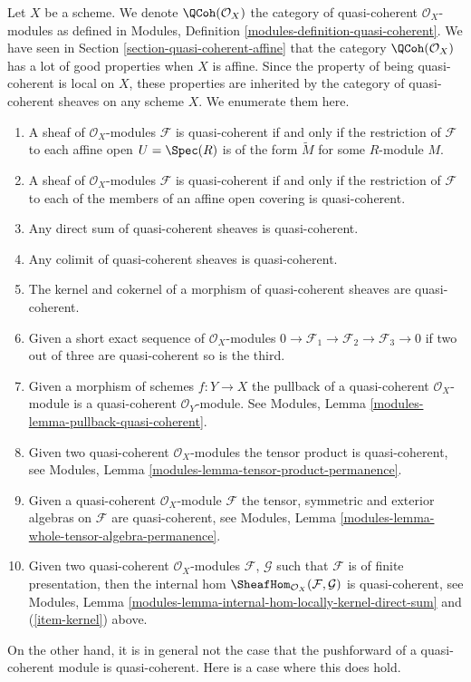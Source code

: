 \noindent
Let $X$ be a scheme. We denote $\QCoh(\mathcal{O}_X)$ the
category of quasi-coherent $\mathcal{O}_X$-modules as defined in
Modules, Definition \ref{modules-definition-quasi-coherent}.
We have seen in
Section \ref{section-quasi-coherent-affine}
that the category $\QCoh(\mathcal{O}_X)$ has a lot of good properties
when $X$ is affine. Since the property of being quasi-coherent is
local on $X$, these properties are inherited by the category
of quasi-coherent sheaves on any scheme $X$. We enumerate them here.
\begin{enumerate}
\item A sheaf of $\mathcal{O}_X$-modules $\mathcal{F}$ is
quasi-coherent if and only if the restriction of $\mathcal{F}$
to each affine open $U = \Spec(R)$ is of the form
$\widetilde M$ for some $R$-module $M$.
\item A sheaf of $\mathcal{O}_X$-modules $\mathcal{F}$ is
quasi-coherent if and only if the restriction of $\mathcal{F}$
to each of the members of an affine open covering is quasi-coherent.
\item Any direct sum of quasi-coherent sheaves is quasi-coherent.
\item Any colimit of quasi-coherent sheaves is quasi-coherent.
\item
\label{item-kernel}
The kernel and cokernel of a morphism of quasi-coherent sheaves
are quasi-coherent.
\item Given a short exact sequence of $\mathcal{O}_X$-modules
$0 \to \mathcal{F}_1 \to \mathcal{F}_2 \to \mathcal{F}_3 \to 0$
if two out of three are quasi-coherent so is the third.
\item Given a morphism of schemes $f : Y \to X$ the pullback
of a quasi-coherent $\mathcal{O}_X$-module is a quasi-coherent
$\mathcal{O}_Y$-module. See
Modules, Lemma \ref{modules-lemma-pullback-quasi-coherent}.
\item Given two quasi-coherent $\mathcal{O}_X$-modules
the tensor product is quasi-coherent, see
Modules, Lemma \ref{modules-lemma-tensor-product-permanence}.
\item Given a quasi-coherent $\mathcal{O}_X$-module $\mathcal{F}$
the tensor, symmetric and exterior algebras on $\mathcal{F}$
are quasi-coherent, see
Modules, Lemma \ref{modules-lemma-whole-tensor-algebra-permanence}.
\item Given two quasi-coherent $\mathcal{O}_X$-modules
$\mathcal{F}$, $\mathcal{G}$ such that $\mathcal{F}$
is of finite presentation, then the internal hom
$\SheafHom_{\mathcal{O}_X}(\mathcal{F}, \mathcal{G})$
is quasi-coherent, see
Modules, Lemma \ref{modules-lemma-internal-hom-locally-kernel-direct-sum}
and (\ref{item-kernel}) above.
\end{enumerate}
On the other hand, it is in general not the case that the
pushforward of a quasi-coherent module is quasi-coherent.
Here is a case where this does hold.

